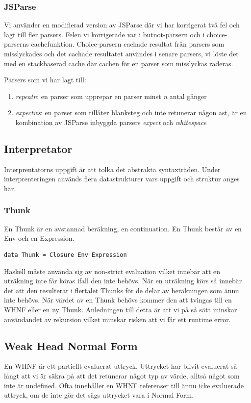 \subsubsection{JSParse}
Vi använder en modifierad version av JSParse där vi har korrigerat två fel och lagt till fler parsers. Felen vi korrigerade var i butnot-parsern och i choice-parserns cachefunktion. 
Choice-parsern cachade resultat från parsers som misslyckades och det cachade resultatet användes i senare parsers, 
vi löste det med en stackbaserad cache där cachen för en parser som misslyckas raderas.

Parsers som vi har lagt till:
\begin{enumerate}
    \item{\emph{repeatn}: en parser som upprepar en parser minst \emph{n} antal gånger}
    \item{\emph{expectws}: en parser som tillåter blanksteg och inte retunerar någon ast, är en kombination av JSParse inbyggda parsers \emph{expect} och \emph{whitespace}}
\end{enumerate}



\subsection{Interpretator}
Interprentatorns uppgift är att tolka det abstrakta syntaxträden. Under interprenteringen används flera datastrukturer vars uppgift och struktur anges här.

\subsubsection{Thunk}
En Thunk är en avstannad beräkning, en continuation. En Thunk består av en Env och en Expression.

\begin{lstlisting}
data Thunk = Closure Env Expression
\end{lstlisting}

Haskell måste använda sig av non-strict evaluation vilket innebär att en uträkning inte får köras ifall den inte behövs. När en uträkning körs så innebär det att den resulterar i flertalet Thunks för de delar av beräkningen som ännu inte behövs. När värdet av en Thunk behövs kommer den att tvingas till en WHNF eller en ny Thunk. Anledningen till detta är att vi på så sätt minskar användandet av rekursion vilket minskar risken att vi får ett runtime error.

\subsection{Weak Head Normal Form}
En WHNF är ett partiellt evaluerat uttryck. Uttrycket har blivit evaluerat så långt att vi är säkra på att det retunerar något typ av värde, alltså något som inte är undefined. Ofta innehåller en WHNF referenser till ännu icke evaluerade uttryck, om de inte gör det sägs uttrycket vara i Normal Form.

